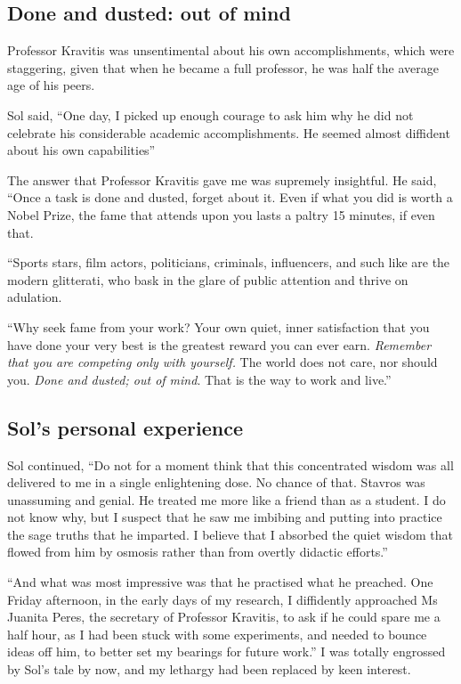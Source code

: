 \documentclass[
  a4paper,
]{article}
\begin{document}
\hypertarget{done-and-dusted-out-of-mind}{%
\subsection{Done and dusted: out of
mind}\label{done-and-dusted-out-of-mind}}

Professor Kravitis was unsentimental about his own accomplishments,
which were staggering, given that when he became a full professor, he
was half the average age of his peers.

Sol said, ``One day, I picked up enough courage to ask him why he did
not celebrate his considerable academic accomplishments. He seemed
almost diffident about his own capabilities''

The answer that Professor Kravitis gave me was supremely insightful. He
said, ``Once a task is done and dusted, forget about it. Even if what
you did is worth a Nobel Prize, the fame that attends upon you lasts a
paltry 15 minutes, if even that.

``Sports stars, film actors, politicians, criminals, influencers, and
such like are the modern glitterati, who bask in the glare of public
attention and thrive on adulation.

``Why seek fame from your work? Your own quiet, inner satisfaction that
you have done your very best is the greatest reward you can ever earn.
\emph{Remember that you are competing only with yourself.} The world
does not care, nor should you. \emph{Done and dusted; out of mind}. That
is the way to work and live.''

\hypertarget{sols-personal-experience}{%
\subsection{Sol's personal experience}\label{sols-personal-experience}}

Sol continued, ``Do not for a moment think that this concentrated wisdom
was all delivered to me in a single enlightening dose. No chance of
that. Stavros was unassuming and genial. He treated me more like a
friend than as a student. I do not know why, but I suspect that he saw
me imbibing and putting into practice the sage truths that he imparted.
I believe that I absorbed the quiet wisdom that flowed from him by
osmosis rather than from overtly didactic efforts.''

``And what was most impressive was that he practised what he preached.
One Friday afternoon, in the early days of my research, I diffidently
approached Ms Juanita Peres, the secretary of Professor Kravitis, to ask
if he could spare me a half hour, as I had been stuck with some
experiments, and needed to bounce ideas off him, to better set my
bearings for future work.'' I was totally engrossed by Sol's tale by
now, and my lethargy had been replaced by keen interest.
\end{document}
